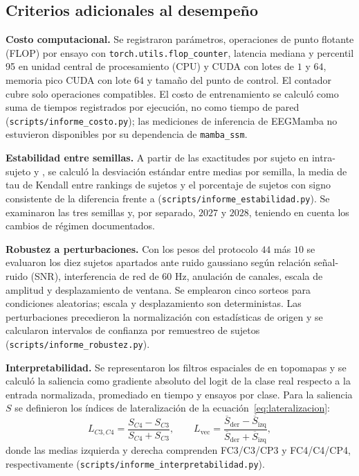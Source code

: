 \subsection{Criterios adicionales al desempeño}
\label{sec:criterios-adicionales}

\textbf{Costo computacional.} Se registraron parámetros, operaciones de punto flotante (FLOP) por ensayo con \texttt{torch.utils.flop\_counter}, latencia mediana y percentil 95 en unidad central de procesamiento (CPU) y CUDA con lotes de $1$ y $64$, memoria pico CUDA con lote $64$ y tamaño del punto de control. El contador cubre solo operaciones compatibles. El costo de entrenamiento se calculó como suma de tiempos registrados por ejecución, no como tiempo de pared (\texttt{scripts/informe\_costo.py}); las mediciones de inferencia de EEGMamba no estuvieron disponibles por su dependencia de \texttt{mamba\_ssm}.

\textbf{Estabilidad entre semillas.} A partir de las exactitudes por sujeto en intra-sujeto y \loso{}, se calculó la desviación estándar entre medias por semilla, la media de tau de Kendall entre rankings de sujetos y el porcentaje de sujetos con signo consistente de la diferencia frente a \eegnet{} (\texttt{scripts/informe\_estabilidad.py}). Se examinaron las tres semillas y, por separado, $2027$ y $2028$, teniendo en cuenta los cambios de régimen documentados.

\textbf{Robustez a perturbaciones.} Con los pesos del protocolo $44$ más $10$ se evaluaron los diez sujetos apartados ante ruido gaussiano según relación señal-ruido (SNR), interferencia de red de $60$ Hz, anulación de canales, escala de amplitud y desplazamiento de ventana. Se emplearon cinco sorteos para condiciones aleatorias; escala y desplazamiento son deterministas. Las perturbaciones precedieron la normalización con estadísticas de origen y se calcularon intervalos de confianza por remuestreo de sujetos (\texttt{scripts/informe\_robustez.py}).

\textbf{Interpretabilidad.} Se representaron los filtros espaciales de \eegnet{} en topomapas y se calculó la saliencia como gradiente absoluto del logit de la clase real respecto a la entrada normalizada, promediado en tiempo y ensayos por clase. Para la saliencia $S$ se definieron los índices de lateralización de la ecuación~\eqref{eq:lateralizacion}:
\begin{equation}
\label{eq:lateralizacion}
L_{C3,C4}=\frac{S_{C4}-S_{C3}}{S_{C4}+S_{C3}},\qquad
L_{\mathrm{vec}}=\frac{\overline S_{\mathrm{der}}-\overline S_{\mathrm{izq}}}{\overline S_{\mathrm{der}}+\overline S_{\mathrm{izq}}},
\end{equation}
donde las medias izquierda y derecha comprenden FC3/C3/CP3 y FC4/C4/CP4, respectivamente (\texttt{scripts/informe\_interpretabilidad.py}).

